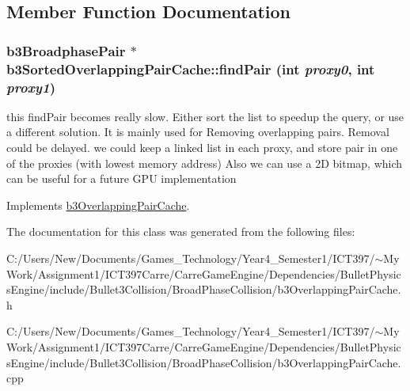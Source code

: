 \subsection{Member Function Documentation}
\hypertarget{classb3_sorted_overlapping_pair_cache_d24f6d5bfc4b9e378ace06bcb10519ea}{
\subsubsection[findPair]{\setlength{\rightskip}{0pt plus 5cm}b3BroadphasePair $\ast$ b3SortedOverlappingPairCache::findPair (int {\em proxy0}, \/  int {\em proxy1})}}
\label{classb3_sorted_overlapping_pair_cache_d24f6d5bfc4b9e378ace06bcb10519ea}


this findPair becomes really slow. Either sort the list to speedup the query, or use a different solution. It is mainly used for Removing overlapping pairs. Removal could be delayed. we could keep a linked list in each proxy, and store pair in one of the proxies (with lowest memory address) Also we can use a 2D bitmap, which can be useful for a future GPU implementation 

Implements \hyperlink{classb3_overlapping_pair_cache}{b3OverlappingPairCache}.

The documentation for this class was generated from the following files:\begin{CompactItemize}
\item 
C:/Users/New/Documents/Games\_\-Technology/Year4\_\-Semester1/ICT397/$\sim$My Work/Assignment1/ICT397Carre/CarreGameEngine/Dependencies/BulletPhysicsEngine/include/Bullet3Collision/BroadPhaseCollision/b3OverlappingPairCache.h\item 
C:/Users/New/Documents/Games\_\-Technology/Year4\_\-Semester1/ICT397/$\sim$My Work/Assignment1/ICT397Carre/CarreGameEngine/Dependencies/BulletPhysicsEngine/include/Bullet3Collision/BroadPhaseCollision/b3OverlappingPairCache.cpp\end{CompactItemize}
